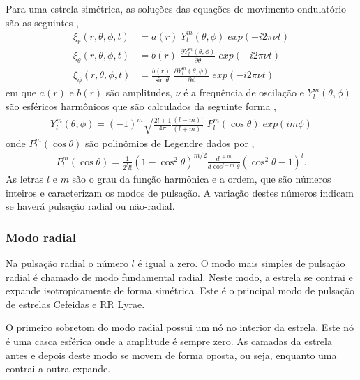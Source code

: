 Para uma estrela simétrica, as soluções das equações de movimento ondulatório são as seguintes \citep{astroseis},
\begin{align}
\xi_{r}(r , \theta , \phi , t) &= a(r) \; Y_{l}^{m}(\theta , \phi) \; exp(-i2\pi\nu t) \\
\xi_{\theta}(r , \theta , \phi , t) &= b(r) \; \frac{\partial Y_{l}^{m}(\theta , \phi)}{\partial\theta} \; exp(-i2\pi\nu t) \\
\xi_{\phi}(r , \theta , \phi , t) &= \frac{b(r)}{\sin\theta} \; \frac{\partial Y_{l}^{m}(\theta , \phi)}{\partial\phi} \; exp(-i2\pi\nu t)
\end{align}
em que $a(r)$ e $ b(r)$ são amplitudes, $ \nu $ é a frequência de oscilação e $ Y^m_l(\theta , \phi) $ são esféricos harmônicos que são calculados da seguinte forma \citep{astroseis},
\begin{align}
Y^m_l(\theta , \phi) = (-1)^m \sqrt{\frac{2l+1}{4\pi}\frac{(l-m)!}{(l+m)!}} \; P_l^m(\cos\theta) \; exp(im\phi)
\end{align}
onde $ P_l^m(\cos\theta)$ são polinômios de Legendre dados por \citep{astroseis},
\begin{align}
P_l^m(\cos\theta) = \frac{1}{2^l l!}(1-\cos^2\theta)^{m/2}\frac{d^{l+m}}{d\cos^{l+m}\theta}(\cos^2\theta - 1)^l .
\end{align}
As letras $ l$ e $ m $ são o grau da função harmônica e a ordem, que são números inteiros e caracterizam os modos de pulsação. A variação destes números indicam se haverá pulsação radial ou não-radial.

\subsubsection{Modo radial}

Na pulsação radial o número $ l$ é igual a zero. O modo mais simples de pulsação radial é chamado de modo fundamental radial. Neste modo, a estrela se contrai e expande isotropicamente de forma simétrica. Este é o principal modo de pulsação de estrelas Cefeidas e RR Lyrae.

O primeiro sobretom do modo radial possui um nó no interior da estrela. Este nó é uma casca esférica onde a amplitude é sempre zero. As camadas da estrela antes e depois deste modo se movem de forma oposta, ou seja, enquanto uma contrai a outra expande.





